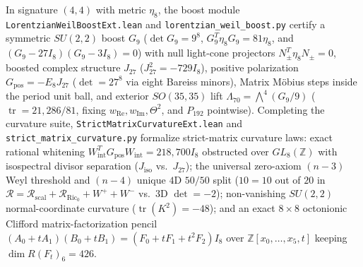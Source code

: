 \documentclass[11pt,a4paper]{article}
\begin{document}
In signature $(4,4)$ with metric $\eta_8$, the boost module {\small\texttt{Lorentzian\allowbreak{}Weil\allowbreak{}Boost\allowbreak{}Ext.lean}} and {\small\texttt{lorentzian\_\allowbreak{}weil\_\allowbreak{}boost.py}} certify a symmetric $SU(2,2)$ boost $G_9$ ($\det G_9 = 9^8$, $G_9^T \eta_8 G_9 = 81 \eta_8$, and $(G_9 - 27I_8)(G_9 - 3I_8) = 0$) with null light-cone projectors $N_\pm^T \eta_8 N_\pm = 0$, boosted complex structure $J_{27}$ ($J_{27}^2 = -729 I_8$), positive polarization $G_{\mathrm{pos}} = -E_8 J_{27}$ ($\det = 27^8$ via eight Bareiss minors), Matrix M\"obius steps inside the period unit ball, and exterior $SO(35,35)$ lift $\Lambda_{70} = \bigwedge^4(G_9/9)$ ($\operatorname{tr} = 21{,}286/81$, fixing $w_{\mathrm{Re}}, w_{\mathrm{Im}}, \Theta^2$, and $P_{192}$ pointwise). Completing the curvature suite, {\small\texttt{Strict\allowbreak{}Matrix\allowbreak{}Curvature\allowbreak{}Ext.lean}} and {\small\texttt{strict\_\allowbreak{}matrix\_\allowbreak{}curvature.py}} formalize strict-matrix curvature laws: exact rational whitening $W_{\mathrm{int}}^T G_{\mathrm{pos}} W_{\mathrm{int}} = 218{,}700 I_8$ obstructed over $GL_8(\mathbb{Z})$ with isospectral divisor separation ($J_{\mathrm{iso}}$ vs.\ $J_{27}$); the universal zero-axiom $(n - 3)$ Weyl threshold and $(n - 4)$ unique $4\mathrm{D}$ $50/50$ split ($10 = 10$ out of $20$ in $\mathcal{R} = \mathcal{R}_{\mathrm{scal}} + \mathcal{R}_{\mathrm{Ric}_0} + W^+ + W^-$ vs.\ $3\mathrm{D}$ $\det = -2$); non-vanishing $SU(2,2)$ normal-coordinate curvature ($\operatorname{tr}(K^2) = -48$); and an exact $8\times 8$ octonionic Clifford matrix-factorization pencil $(A_0 + t A_1)(B_0 + t B_1) = (F_0 + t F_1 + t^2 F_2) I_8$ over $\mathbb{Z}[x_0,\dots,x_5, t]$ keeping $\dim R(F_t)_6 = 426$.
\end{document}
